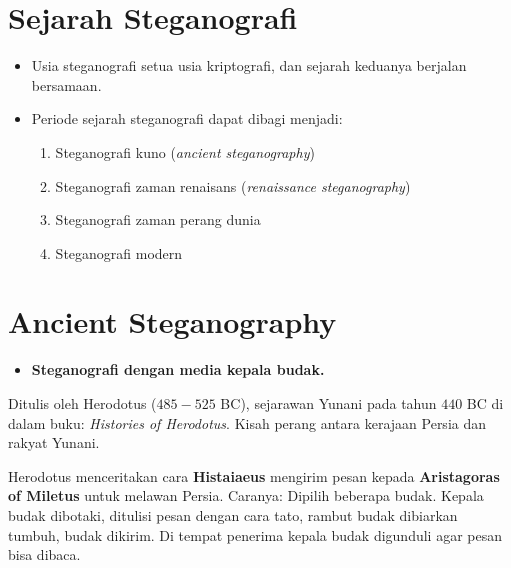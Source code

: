 \documentclass{article}
\begin{document}
\newpage


\section*{Sejarah Steganografi}

\begin{itemize}
    \item Usia steganografi setua usia kriptografi, dan sejarah keduanya berjalan bersamaan.
\end{itemize}

\begin{itemize}
    \item Periode sejarah steganografi dapat dibagi menjadi:
    \begin{enumerate}
        \item Steganografi kuno (\textit{ancient steganography})
        \item Steganografi zaman renaisans (\textit{renaissance steganography})
        \item Steganografi zaman perang dunia
        \item Steganografi modern
    \end{enumerate}
\end{itemize}

\newpage


\vspace{68.31mm}

\section*{Ancient Steganography}

\begin{itemize}
    \item \textbf{Steganografi dengan media kepala budak.}
\end{itemize}

Ditulis oleh Herodotus ($485 - 525$ BC), sejarawan Yunani pada tahun $440$ BC di dalam buku: \textit{Histories of Herodotus}. Kisah perang antara kerajaan Persia dan rakyat Yunani.

\vspace{10mm}

Herodotus menceritakan cara \textbf{Histaiaeus} mengirim pesan kepada \textbf{Aristagoras of Miletus} untuk melawan Persia. Caranya: Dipilih beberapa budak. Kepala budak dibotaki, ditulisi pesan dengan cara tato, rambut budak dibiarkan tumbuh, budak dikirim. Di tempat penerima kepala budak digunduli agar pesan bisa dibaca.
\end{document}
